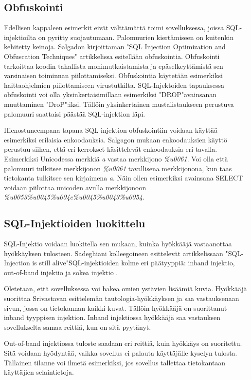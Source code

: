 \documentclass[finnish]{tktltiki2}
\theoremstyle{definition}
\theoremstyle{remark}
\begin{document}
	\subsection{Obfuskointi}
	
	Edellisen kappaleen esimerkit eivät välttämättä toimi sovelluksessa, joissa SQL-injektioilta on pyritty suojautumaan. Palomuurien kiertämiseen on kuitenkin kehitetty keinoja. Salgadon kirjoittaman "SQL Injection Optimization and Obfuscation Techniques"\space\cite{encoding} artikkelissa esitellään obfuskointia. Obfuskointi tarkoittaa koodin tahallista monimutkaistamista ja epäselkeyttämistä sen varsinaisen toiminnan piilottamiseksi. Obfuskointia käytetään esimerkiksi haittaohjelmien piilottamiseen virustutkilta. SQL-Injektoiden tapauksessa obfuskointi voi olla yksinkertaisimillaan esimerkiksi "DROP"\space avainsanan muuttaminen "DroP":iksi. Tällöin yksinkertainen mustalistaukseen perustuva palomuuri saattaisi päästää SQL-injektion läpi.
	
	Hienostuneempana tapana SQL-injektion obfuskointiin voidaan käyttää esimerkiksi erilaisia enkoodauksia. Salgagon mukaan enkoodauksien käyttö perustuu siihen, että eri kerrokset käsittelevät enkoodauksia eri tavalla. Esimerkiksi Unicodessa merkkiä \textit{a} vastaa merkkijono \textit{\%u0061}. Voi olla että palomuuri tulkitsee merkkijonon \textit{\%u0061} tavallisena merkkijonona, kun taas tietokanta tulkitsee sen kirjaimena \textit{a}. Näin ollen esimerkiksi avainsana SELECT voidaan piilottaa unicoden avulla merkkijonoon \textit{\%u0053\%u0045\%u004c\%u0045\%u0043\%u0054}.
	
	\subsection{SQL-Injektioiden luokittelu}
		SQL-Injektio voidaan luokitella sen mukaan, kuinka hyökkääjä vastaanottaa hyökkäyksen tulosteen. Sadeghiani kolleegoineen esittelevät artikkelissaan "SQL-Injection is still alive"\space  SQL-injektioiden kolme eri päätyyppiä: inband injektio, out-of-band injektio ja sokea injektio \cite{still-alive}.
	
	Oletetaan, että sovelluksessa voi hakea omien ystävien lisäämiä kuvia. Hyökkääjä suorittaa Srivastavan esittelemän tautologia-hyökkäyksen ja saa vastauksenaan sivun, jossa on tietokannan kaikki kuvat. Tällöin hyökkääjä on suorittanut inband tyyppisen injektion. Inband injektiossa hyökkääjä saa vastauksen sovellukselta samaa reittiä, kun on sitä pyytänyt.
	
	Out-of-band injektiossa tuloste saadaan eri reittiä, kuin hyökkäys on suoritettu. Sitä voidaan hyödyntää, vaikka sovellus ei palauta käyttäjälle kyselyn tulosta. Tällainen tilanne voi ilmetä esimerkiksi, jos sovellus tallettaa tietokantaan käyttäjien selaintietoja. 
	
\end{document}
